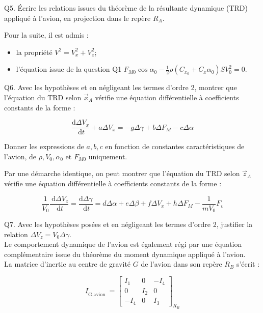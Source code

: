 \documentclass[10pt]{article}
\begin{document}
Q5. Écrire les relations issues du théorème de la résultante dynamique (TRD) appliqué à l'avion, en projection dans le repère $R_{A}$.

Pour la suite, il est admis :

\begin{itemize}
  \item[-] la propriété $V^{2}=V_{x}^{2}+V_{z}^{2}$;
  \item[-] l'équation issue de la question Q1 $F_{M 0} \cos \alpha_{0}-\frac{1}{2} \rho\left(C_{x_{0}}+C_{x} \alpha_{0}\right) S V_{0}^{2}=0$.
\end{itemize}

Q6. Avec les hypothèses et en négligeant les termes d'ordre 2, montrer que l'équation du TRD selon $\vec{x}_{A}$ vérifie une équation différentielle à coefficients constants de la forme :


\begin{equation*}
\frac{\mathrm{d} \Delta V_{x}}{\mathrm{~d} t}+a \Delta V_{x}=-g \Delta \gamma+b \Delta F_{M}-c \Delta \alpha \tag{1}
\end{equation*}


Donner les expressions de $a, b, c$ en fonction de constantes caractéristiques de l'avion, de $\rho, V_{0}, \alpha_{0}$ et $F_{M 0}$ uniquement.

Par une démarche identique, on peut montrer que l'équation du TRD selon $\vec{z}_{A}$ vérifie une équation différentielle à coefficients constants de la forme :


\begin{equation*}
\frac{1}{V_{0}} \frac{\mathrm{~d} \Delta V_{z}}{\mathrm{~d} t}=\frac{\mathrm{d} \Delta \gamma}{\mathrm{~d} t}=d \Delta \alpha+e \Delta \beta+f \Delta V_{x}+h \Delta F_{M}-\frac{1}{m V_{0}} F_{v} \tag{2}
\end{equation*}


Q7. Avec les hypothèses posées et en négligeant les termes d'ordre 2, justifier la relation $\Delta V_{z}=V_{0} \Delta \gamma$.\\
Le comportement dynamique de l'avion est également régi par une équation complémentaire issue du théorème du moment dynamique appliqué à l'avion.\\
La matrice d'inertie au centre de gravité $G$ de l'avion dans son repère $R_{B}$ s'écrit :

$$
\underline{I}_{\text {G,avion }}=\left[\begin{array}{rrr}
I_{1} & 0 & -I_{4} \\
0 & I_{2} & 0 \\
-I_{4} & 0 & I_{3}
\end{array}\right]_{R_{B}}
$$
\end{document}
